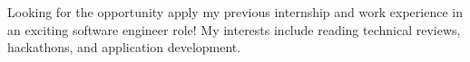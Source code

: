 

\begin{cvparagraph}
Looking for the opportunity apply my previous internship and work experience in an exciting software engineer role! My interests include reading technical reviews, hackathons, and application development.
\end{cvparagraph}
